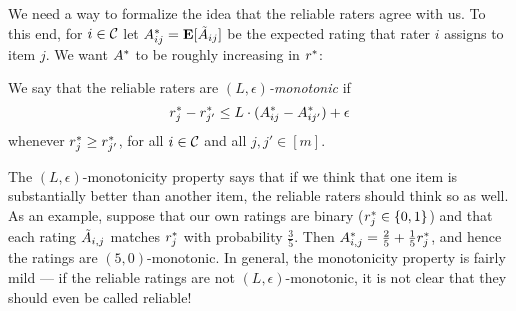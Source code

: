 We need a way to formalize the idea that the reliable raters 
agree with us. To this end, for $i \in \mathcal{C}$ let $A^*_{ij} = \mathbf{E}[\tilde{A}_{ij}]$ be
the expected rating that rater $i$ assigns to item $j$.
We want $A^*$ to be roughly increasing in $r^*$:
\begin{definition}
\label{def:lipschitz}
We say that the reliable raters are \emph{$(L,\epsilon)$-monotonic} if 
\vskip -0.18in
\begin{equation}
\label{eq:lipschitz}
r^*_j - r^*_{j'} \leq L \cdot (A^*_{ij} - A^*_{ij'}) + \epsilon
\end{equation}
\vskip -0.07in
whenever $r^*_j \geq r^*_{j'}$, 
for all $i \in \mathcal{C}$ and all $j,j' \in [m]$.
\end{definition}
The $(L,\epsilon)$-monotonicity property says that if we think that one item is 
substantially better than another item, the reliable raters should think 
so as well. As an example, suppose that our own ratings are binary 
($r^*_j \in \{0,1\}$) and that each rating $\tilde{A}_{i,j}$ matches $r^*_j$ 
with probability $\frac{3}{5}$. Then 
$A^*_{i,j} = \frac{2}{5} + \frac{1}{5}r^*_j$, 
and hence the ratings are $(5,0)$-monotonic. 
In general, the monotonicity property is fairly mild --- if the reliable ratings 
are not $(L,\epsilon)$-monotonic, it is not clear that they should 
even be called reliable!



